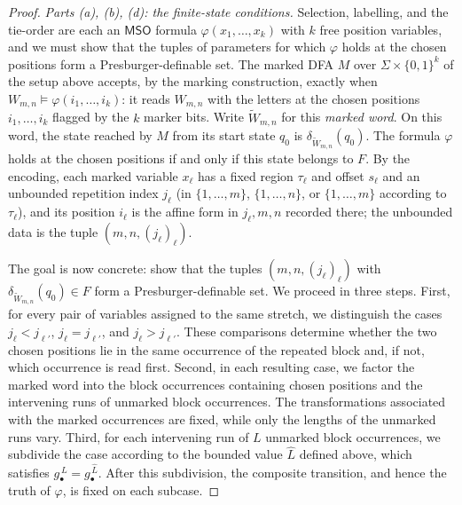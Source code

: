 \documentclass[10pt,a4paper]{amsart}
\newcommand{\MSO}{\mathsf{MSO}}
\begin{document}
\begin{proof}
\vspace{0.5em}
\noindent\emph{Parts (a), (b), (d): the finite-state conditions.}
Selection, labelling, and the tie-order are each an $\MSO$ formula
$\varphi(x_1,\ldots,x_k)$ with $k$ free position variables, and we must show that
the tuples of parameters for which $\varphi$ holds at the chosen positions form a
Presburger-definable set.  The marked DFA $M$ over $\Sigma\times\{0,1\}^k$ of the setup
above accepts, by the marking construction, exactly when
$W_{m,n}\models\varphi(i_1,\ldots,i_k)$: it reads $W_{m,n}$ with the letters at
the chosen positions $i_1,\ldots,i_k$ flagged by the $k$ marker bits.  Write
$\widetilde W_{m,n}$ for this \emph{marked word}.  On this word, the state
reached by $M$ from its start state $q_0$ is
$\delta_{\widetilde W_{m,n}}(q_0)$.  The formula $\varphi$ holds at the chosen
positions if and only if this state belongs to $F$.  By the encoding, each marked
variable $x_\ell$ has a fixed region $\tau_\ell$ and offset $s_\ell$ and an
unbounded repetition index $j_\ell$ (in $\{1,\ldots,m\}$, $\{1,\ldots,n\}$, or
$\{1,\ldots,m\}$ according to $\tau_\ell$), and its position $i_\ell$ is the
affine form in $j_\ell,m,n$ recorded there; the unbounded data is the tuple
$(m,n,(j_\ell)_\ell)$.

The goal is now concrete: show that the tuples $(m,n,(j_\ell)_\ell)$ with
$\delta_{\widetilde W_{m,n}}(q_0)\in F$ form a Presburger-definable set.  We
proceed in three steps.  First, for every pair of variables assigned to the same
stretch, we distinguish the cases $j_\ell<j_{\ell'}$,
$j_\ell=j_{\ell'}$, and $j_\ell>j_{\ell'}$.  These comparisons determine
whether the two chosen positions lie in the same occurrence of the repeated
block and, if not, which occurrence is read first.  Second, in each resulting
case, we factor the marked word into the block occurrences containing chosen
positions and the intervening runs of unmarked block occurrences.  The
transformations associated with the marked occurrences are fixed, while only
the lengths of the unmarked runs vary.  Third, for each intervening run of $L$
unmarked block occurrences, we subdivide the case according to the bounded
value $\widehat L$ defined above, which satisfies
$g_\bullet^{\,L}=g_\bullet^{\,\widehat L}$.  After this subdivision, the
composite transition, and hence the truth of $\varphi$, is fixed on each
subcase.


\end{proof}
\end{document}
